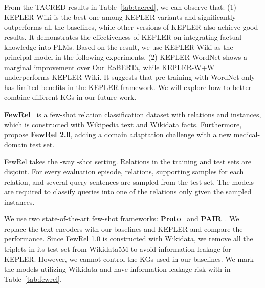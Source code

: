 From the TACRED results in Table~\ref{tab:tacred}, 
we can observe that: (1) KEPLER-Wiki is the best one among KEPLER variants and significantly outperforms all the baselines, while other versions of KEPLER also achieve good results. It demonstrates the effectiveness of KEPLER on integrating factual knowledge into PLMs. Based on the result, we use KEPLER-Wiki as the principal model in the following experiments. (2) KEPLER-WordNet shows a marginal improvement over Our RoBERTa, while KEPLER-W+W underperforms KEPLER-Wiki. It suggests that pre-training with WordNet only has limited benefits in the KEPLER framework. We will explore how to better combine different KGs in our future work.




\textbf{FewRel}~\citep{han-etal-2018-fewrel} is a few-shot relation classification dataset with  relations and  instances, which is constructed with Wikipedia text and Wikidata facts. Furthermore, \citet{gao-etal-2019-fewrel} propose \textbf{FewRel 2.0}, adding a domain adaptation challenge with a new medical-domain test set.

FewRel takes the -way -shot setting. Relations in the training and test sets are disjoint. For every evaluation episode,  relations,  supporting samples for each relation, and several query sentences are sampled from the test set. The models are required to classify queries into one of the  relations only given the sampled  instances.

We use two state-of-the-art few-shot frameworks: \textbf{Proto}~\citep{snell2017prototypical} and \textbf{PAIR}~\citep{gao-etal-2019-fewrel}. We replace the text encoders with our baselines and KEPLER and compare the performance. Since FewRel 1.0 is constructed with Wikidata, we remove all the triplets in its test set from Wikidata5M to avoid information leakage for KEPLER. However, we cannot control the KGs used in our baselines. We mark the models utilizing Wikidata and have information leakage risk with  in Table~\ref{tab:fewrel}.

